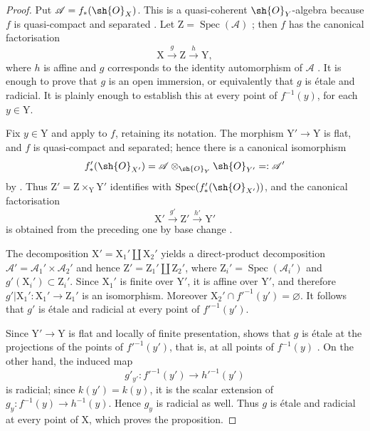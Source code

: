\begin{proof}
Put $\mathscr{A}=f_*(\sh{O}_X)$. This is a quasi-coherent $\sh{O}_Y$-algebra because $f$ is quasi-compact and separated . Let $\mathrm{Z}=\operatorname{Spec}(\mathscr{A})$ ; then $f$ has the canonical factorisation
\[
  \mathrm{X}\xrightarrow{g}\mathrm{Z}\xrightarrow{h}\mathrm{Y},
\]
where $h$ is affine and $g$ corresponds to the identity automorphism of $\mathscr{A}$ . It is enough to prove that $g$ is an open immersion, or equivalently  that $g$ is \'etale and radicial. It is plainly enough to establish this at every point of $f^{-1}(y)$, for each $y\in\mathrm{Y}$.

Fix $y\in\mathrm{Y}$ and apply  to $f$, retaining its notation. The morphism $\mathrm{Y}'\to\mathrm{Y}$ is flat, and $f$ is quasi-compact and separated; hence there is a canonical isomorphism
\[
  f'_*(\sh{O}_{X'})
  =\mathscr{A}\otimes_{\sh{O}_Y}\sh{O}_{Y'}
  =:\mathscr{A}'
\]
by . Thus $\mathrm{Z}'=\mathrm{Z}\times_{\mathrm{Y}}\mathrm{Y}'$ identifies with $\operatorname{Spec}(f'_*(\sh{O}_{X'}))$, and the canonical factorisation
\[
  \mathrm{X}'\xrightarrow{g'}\mathrm{Z}'\xrightarrow{h'}\mathrm{Y}'
\]
is obtained from the preceding one by base change .

The decomposition $\mathrm{X}'=\mathrm{X}_1'\amalg\mathrm{X}_2'$ yields a direct-product decomposition $\mathscr{A}'=\mathscr{A}_1'\times\mathscr{A}_2'$ and hence $\mathrm{Z}'=\mathrm{Z}_1'\amalg\mathrm{Z}_2'$, where $\mathrm{Z}_i'=\operatorname{Spec}(\mathscr{A}_i')$ and $g'(\mathrm{X}_i')\subset\mathrm{Z}_i'$. Since $\mathrm{X}_1'$ is finite over $\mathrm{Y}'$, it is affine over $\mathrm{Y}'$, and therefore $g'|\mathrm{X}_1':\mathrm{X}_1'\to\mathrm{Z}_1'$ is an isomorphism. Moreover $\mathrm{X}_2'\cap f'^{-1}(y')=\varnothing$. It follows that $g'$ is \'etale and radicial at every point of $f'^{-1}(y')$.

Since $\mathrm{Y}'\to\mathrm{Y}$ is flat and locally of finite presentation,  shows that $g$ is \'etale at the projections of the points of $f'^{-1}(y')$, that is, at all points of $f^{-1}(y)$ . On the other hand, the induced map
\[
  g'_{y'}:f'^{-1}(y')\longrightarrow h'^{-1}(y')
\]
is radicial; since $k(y')=k(y)$, it is the scalar extension of $g_y:f^{-1}(y)\to h^{-1}(y)$. Hence $g_y$ is radicial as well. Thus $g$ is \'etale and radicial at every point of $\mathrm{X}$, which proves the proposition.
\end{proof}

